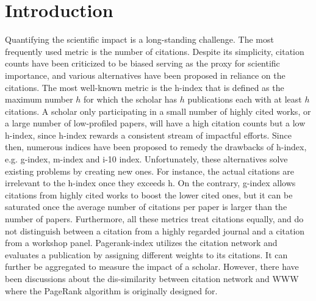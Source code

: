 \section*{Introduction}

Quantifying the scientific impact is a long-standing challenge. The most frequently used metric is the number of citations\supercite{hirsch2005index,Radicchi2008,garfield1979citation,Garfield2006}. Despite its simplicity, citation counts have been criticized to be biased serving as the proxy for scientific importance, and various alternatives have been proposed in reliance on the citations. The most well-known metric is the h-index\supercite{hirsch2005index} that is defined as the maximum number $h$ for which the scholar has $h$ publications each with at least $h$ citations. A scholar only participating in a small number of highly cited works, or a large number of low-profiled papers, will have a high citation counts but a low h-index, since h-index rewards a consistent stream of impactful efforts. Since then, numerous indices have been proposed to remedy the drawbacks of h-index, e.g. g-index\supercite{egghe2006theory}, m-index\supercite{hirsch2005index} and i-10 index\supercite{Connor2011}. Unfortunately, these alternatives solve existing problems by creating new ones. For instance, the actual citations are irrelevant to the h-index once they exceeds h. On the contrary, g-index allows citations from highly cited works to boost the lower cited ones, but it can be saturated once the average number of citations per paper is larger than the number of papers. Furthermore, all these metrics treat citations equally, and do not distinguish between a citation from a highly regarded journal and a citation from a workshop panel. Pagerank-index\supercite{chen2007finding,walker2007ranking,ma2008bringing} utilizes the citation network and evaluates a publication by assigning different weights to its citations. It can further be aggregated to measure the impact of a scholar\supercite{senanayake2015pagerank}. However, there have been discussions about the dis-similarity between citation network and WWW where the PageRank algorithm is originally designed for\supercite{chen2007finding}.

\iffalse
scaling laws\supercite{price1976general,barabasi1999emergence,peterson2010nonuniversal,redner1998popular,redner2004citation,Radicchi2008,stringer2008effectiveness}
aging\supercite{barabasi1999emergence,albert2002statistical,boccaletti2006complex,krapivsky2001organization,newman2009first,hajra2004phase,hajra2005aging,hajra2006modelling,wang2008measuring,dorogovtsev2000evolution,dorogovtsev2001scaling,zhu2003effect}
\fi

